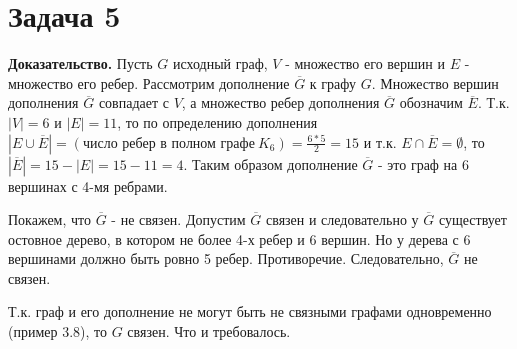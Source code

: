 \documentclass{article}
\begin{document}
\section*{Задача 5}
{\bf Доказательство.} Пусть $G$ исходный граф, $V$ - множество его вершин и $E$ - множество его ребер. Рассмотрим дополнение $\overline{G}$ к графу $G$. Множество вершин дополнения $\overline{G}$ совпадает с $V$, а множество ребер дополнения $\overline{G}$ обозначим $\overline{E}$. Т.к. $|V|=6$ и $|E|=11$, то по определению дополнения $|E\cup\overline{E}|= (\textrm{число ребер в полном графе}\ K_6)=\frac{6*5}{2}=15$ и т.к. $E\cap\overline{E}=\emptyset$, то $|\overline{E}|=15 - |E| = 15 - 11 = 4$. Таким образом дополнение $\overline{G}$ - это граф на 6 вершинах с 4-мя ребрами. 
\par
Покажем, что $\overline{G}$ - не связен. Допустим $\overline{G}$ связен и следовательно у  $\overline{G}$ существует остовное дерево, в котором не более 4-х ребер и 6 вершин. Но у дерева с 6 вершинами должно быть ровно 5 ребер. Противоречие. Следовательно, $\overline{G}$ не связен. 
\par
Т.к. граф и его дополнение не могут быть не связными графами одновременно (пример 3.8), то $G$ связен. Что и требовалось.
\end{document}
